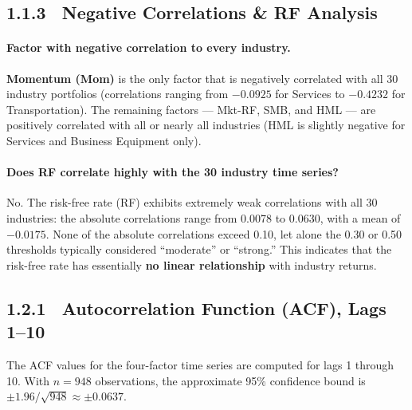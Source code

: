 \documentclass[12pt]{article}
\begin{document}
	\subsection{1.1.3 \ Negative Correlations \& RF Analysis}
	
	\paragraph{Factor with negative correlation to every industry.}
	\textbf{Momentum (Mom)} is the only factor that is negatively correlated with all 30 industry portfolios (correlations ranging from $-0.0925$ for Services to $-0.4232$ for Transportation). The remaining factors --- Mkt-RF, SMB, and HML --- are positively correlated with all or nearly all industries (HML is slightly negative for Services and Business Equipment only).
	
	\paragraph{Does RF correlate highly with the 30 industry time series?}
	No. The risk-free rate (RF) exhibits extremely weak correlations with all 30 industries: the absolute correlations range from 0.0078 to 0.0630, with a mean of $-0.0175$. None of the absolute correlations exceed 0.10, let alone the 0.30 or 0.50 thresholds typically considered ``moderate'' or ``strong.'' This indicates that the risk-free rate has essentially \textbf{no linear relationship} with industry returns.
	
	\newpage
	\subsection{1.2.1 \ Autocorrelation Function (ACF), Lags 1--10}
	
	The ACF values for the four-factor time series are computed for lags 1 through 10. With $n = 948$ observations, the approximate 95\% confidence bound is $\pm 1.96 / \sqrt{948} \approx \pm 0.0637$.
	
\end{document}
